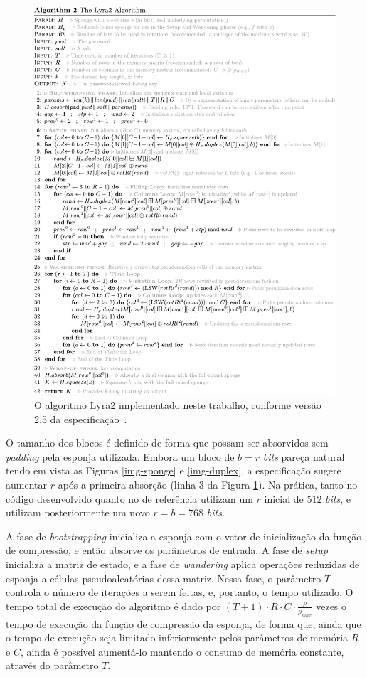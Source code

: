 \documentclass{article}
\begin{document}
\begin{figure}[htbp]
\centering
\includegraphics[width=\linewidth]{./img/spec.pdf}
\caption{O algoritmo Lyra2 implementado neste trabalho\label{lyra2-alg}, conforme versão 2.5 da especificação~\cite{lyra2-spec}.}
\end{figure}

O tamanho dos blocos é definido de forma que possam ser absorvidos sem
\emph{padding} pela esponja utilizada. Embora um bloco de $b = r$ \emph{bits}
pareça natural tendo em vista as Figuras \ref{img-sponge} e
\ref{img-duplex}, a especificação sugere aumentar $r$ após a primeira
absorção (linha 3 da Figura \ref{lyra2-alg}). Na prática, tanto no
código desenvolvido quanto no de referência utilizam um $r$ inicial de $512$ \emph{bits},
e utilizam posteriormente um novo $r = b = 768$ \emph{bits}.

A fase de \emph{bootstrapping} inicializa a esponja com o vetor de
inicialização da função de compressão, e então absorve os parâmetros de
entrada. A fase de \emph{setup} inicializa a matriz de estado, e a fase
de \emph{wandering} aplica operações reduzidas de esponja a células
pseudoaleatórias dessa matriz. Nessa fase, o parâmetro $T$ controla o
número de iterações a serem feitas, e, portanto, o tempo utilizado.
O tempo total de execução do algoritmo é dado por
$(T + 1) \cdot R \cdot C \cdot \frac{\rho}{\rho_{max}}$ vezes o tempo
de execução da função de compressão da esponja, de forma que, ainda que
o tempo de execução seja limitado inferiormente pelos parâmetros de
memória $R$ e $C$, ainda é possível aumentá-lo mantendo o consumo de
memória constante, através do parâmetro $T$.
\end{document}
